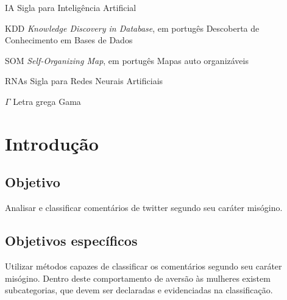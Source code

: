 \documentclass[
	12pt,				%
	openright,			%
	twoside,			%
	a4paper,			%
	english,			%
	french,				%
	spanish,			%
	brazil				%
	]{abntex2}
\begin{document}
\listoftables*

\cleardoublepage

\begin{siglas}
  \item[IA] Sigla para Inteligência Artificial
  \item[KDD] \emph{Knowledge Discovery in Database}, em portugês Descoberta de Conhecimento em Bases de Dados
  \item[SOM] \emph{Self-Organizing Map}, em portugês Mapas auto organizáveis
  \item[RNAs] Sigla para Redes Neurais Artificiais
  
\end{siglas}

\begin{simbolos}
  \item[$ \Gamma $] Letra grega Gama
  
\end{simbolos}

\tableofcontents*
\cleardoublepage



\textual

\chapter{Introdução}

\section{Objetivo}
Analisar e classificar comentários de twitter segundo seu caráter misógino.
\section{Objetivos específicos}
Utilizar métodos capazes de classificar os comentários segundo seu caráter misógino.
Dentro deste comportamento de aversão às mulheres existem subcategorias, que devem ser declaradas e evidenciadas na classificação.
\end{document}
